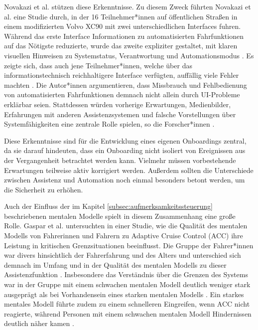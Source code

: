 Novakazi et al. \cite{novakazi2025mind} stützen diese Erkenntnisse. Zu diesem Zweck führten Novakazi et al. \cite{novakazi2025mind} eine Studie durch, in der 16 Teilnehmer*innen auf öffentlichen Straßen in einem modifizierten Volvo XC90 mit zwei unterschiedlichen Interfaces fuhren. Während das erste Interface Informationen zu automatisierten Fahrfunktionen auf das Nötigste reduzierte, wurde das zweite expliziter gestaltet, mit klaren visuellen Hinweisen zu Systemstatus, Verantwortung und Automationsmodus \cite{novakazi2025mind}. Es zeigte sich, dass auch jene Teilnehmer*innen, welche über das informationstechnisch reichhaltigere Interface verfügten, auffällig viele Fehler machten \cite{novakazi2025mind}. Die Autor*innen \cite{novakazi2025mind} argumentieren, dass Missbrauch und Fehlbedienung von automatisierten Fahrfunktionen demnach nicht allein durch UI-Probleme erklärbar seien. Stattdessen würden vorherige Erwartungen, Medienbilder, Erfahrungen mit anderen Assistenzsystemen und falsche Vorstellungen über Systemfähigkeiten eine zentrale Rolle spielen, so die Forscher*innen \cite{novakazi2025mind}. 

Diese Erkenntnisse sind für die Entwicklung eines eigenen Onboardings zentral, da sie darauf hindeuten, dass ein Onboarding nicht isoliert von Ereignissen aus der Vergangenheit betrachtet werden kann. Vielmehr müssen vorbestehende Erwartungen teilweise aktiv korrigiert werden. Außerdem sollten die Unterschiede zwischen Assistenz und Automation noch einmal besonders betont werden, um die Sicherheit zu erhöhen.

Auch der Einfluss der im Kapitel \ref{subsec:aufmerksamkeitssteuerung} beschriebenen mentalen Modelle spielt in diesem Zusammenhang eine große Rolle. Gaspar et al. \cite{gaspar2020impact} untersuchten in einer Studie, wie die Qualität des mentalen Modells von Fahrerinnen und Fahrern zu Adaptive Cruise Control (ACC) ihre Leistung in kritischen Grenzsituationen beeinflusst. Die Gruppe der Fahrer*innen war divers hinsichtlich der Fahrerfahrung und des Alters und unterschied sich demnach im Umfang und in der Qualität des mentalen Modells zu dieser Assistenzfunktion \cite{gaspar2020impact}. Insbesondere das Verständnis über die Grenzen des Systems war in der Gruppe mit einem schwachen mentalen Modell deutlich weniger stark ausgeprägt als bei Vorhandensein eines starken mentalen Modells \cite{gaspar2020impact}. Ein starkes mentales Modell führte zudem zu einem schnelleren Eingreifen, wenn ACC nicht reagierte, während Personen mit einem schwachen mentalen Modell Hindernissen deutlich näher kamen \cite{gaspar2020impact}.


